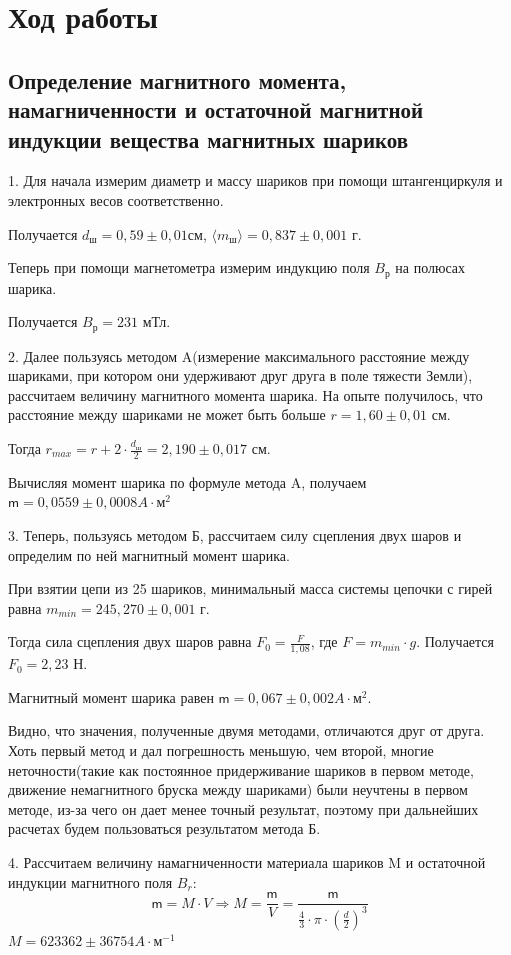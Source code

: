 \documentclass[a4paper,12pt]{article}
\begin{document}
\section*{Ход работы}
\subsection*{Определение магнитного момента, намагниченности и остаточной магнитной индукции вещества магнитных шариков}
1. Для начала измерим диаметр и массу шариков при помощи штангенциркуля и электронных весов соответственно.

Получается $d_{\text{ш}} = 0,59 \pm 0,01$см, $\langle m_{\text{ш}} \rangle = 0,837 \pm 0,001$ г.

Теперь при помощи магнетометра измерим индукцию поля $B_{\text{р}}$ на полюсах шарика.

Получается $B_{\text{р}} = 231$ мТл.

2. Далее пользуясь методом A(измерение максимального расстояние между шариками, при котором они удерживают друг друга в поле тяжести Земли), рассчитаем величину магнитного момента шарика. На опыте получилось, что расстояние между шариками не может быть больше $r = 1,60 \pm 0,01$ см.

Тогда $r_{max} = r + 2 \cdot \frac{d_{\text{ш}}}{2} = 2,190 \pm 0,017$ см.

Вычисляя момент шарика по формуле метода A, получаем $\textsf{m} = 0,0559 \pm 0,0008 A \cdot \text{м}^2$ 

3. Теперь, пользуясь методом Б, рассчитаем силу сцепления двух шаров и определим по ней магнитный момент шарика.

При взятии цепи из 25 шариков, минимальный масса системы цепочки с гирей равна $m_{min} = 245,270 \pm 0,001$ г.

Тогда сила сцепления двух шаров равна $F_0 = \frac{F}{1,08}$, где $F = m_{min} \cdot g$. Получается $F_0 = 2,23$ Н.

Магнитный момент шарика равен $\textsf{m} = 0,067 \pm 0,002 A \cdot \text{м}^2$.

Видно, что значения, полученные двумя методами, отличаются друг от друга. Хоть первый метод и дал погрешность меньшую, чем второй, многие неточности(такие как постоянное придерживание шариков в первом методе, движение немагнитного бруска между шариками) были неучтены в первом методе, из-за чего он дает менее точный результат, поэтому при дальнейших расчетах будем пользоваться результатом метода Б.

4. Рассчитаем величину намагниченности материала шариков M и остаточной индукции магнитного поля $B_r$:
\[\textsf{m} = M \cdot V \Rightarrow M = \frac{\textsf{m}}{V} = \frac{\textsf{m}}{\frac{4}{3} \cdot \pi \cdot {(\frac{d}{2})}^3}\]
$M = 623362 \pm 36754 A \cdot \text{м}^{-1}$
\end{document}
